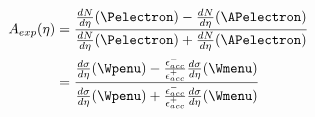 \begin{align} 
A_{exp}(\eta) &= \frac{ \frac{dN}{d\eta}(\Pelectron) -
\frac{dN}{d\eta}(\APelectron) }{ \frac{dN}{d\eta}(\Pelectron) +
\frac{dN}{d\eta}(\APelectron) }\\   
              &= \frac{ \frac{d\sigma}{d\eta}(\Wpenu) -
\frac{\epsilon^{-}_{acc}}{\epsilon^{+}_{acc}} \frac{d\sigma}{d\eta}(\Wmenu) }{
\frac{d\sigma}{d\eta}(\Wpenu) + \frac{\epsilon^{-}_{acc}}{\epsilon^{+}_{acc}}
\frac{d\sigma}{d\eta}(\Wmenu) }
\label{eq:AsymExpCorr}
\end{align}





